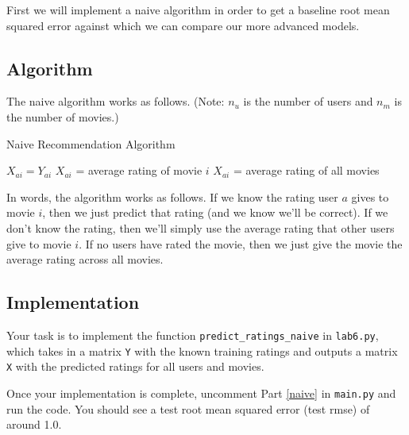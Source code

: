 \documentclass{article}
\begin{document}
First we will implement a naive algorithm in order to get a baseline root mean squared error against which we can compare our more advanced models.

\subsection{Algorithm}

The naive algorithm works as follows. (Note: $n_u$ is the number of users and $n_m$ is the number of movies.)

\begin{algorithm}[H]
    \caption{Naive Recommendation Algorithm}
    \label{perceptron}
    
    \begin{algorithmic}[1]
                    \State $X_{ai} = Y_{ai}$
                    \State $X_{ai}$ = average rating of movie $i$
                \Else
                    \State $X_{ai}$ = average rating of all movies
                \EndIf
            \EndFor
        \EndFor
        \State {}
        \EndProcedure
    \end{algorithmic}
\end{algorithm}

In words, the algorithm works as follows. If we know the rating user $a$ gives to movie $i$, then we just predict that rating (and we know we'll be correct). If we don't know the rating, then we'll simply use the average rating that other users give to movie $i$. If no users have rated the movie, then we just give the movie the average rating across all movies.

\subsection{Implementation}

Your task is to implement the function \texttt{predict\_ratings\_naive} in \texttt{lab6.py}, which takes in a matrix \texttt{Y} with the known training ratings and outputs a matrix \texttt{X} with the predicted ratings for all users and movies.

Once your implementation is complete, uncomment Part \ref{naive} in \texttt{main.py} and run the code. You should see a test root mean squared error (test rmse) of around 1.0.
\end{document}
